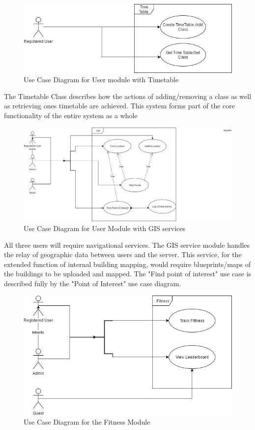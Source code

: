 \documentclass{article}
\begin{document}
		
	
		\begin{figure}[h]
			\includegraphics[width=\textwidth]{./Images/User_Use_Case_Diagrams_TimeTable.jpg}
			\caption{Use Case Diagram for User module with Timetable }
		\end{figure}
	
		{The Timetable Class describes how the actions of adding/removing a class as well as retrieving ones timetable are achieved. This system forms part of the core functionality of the entire system as a whole}
		
		\begin{figure}[h]
			\includegraphics[width=\textwidth]{./Images/User_Use_Case_Diagrams_GIS.jpg}
			\caption{Use Case Diagram for User Module with GIS services}
		\end{figure}
	
		{All three users will require navigational services. The GIS service module handles the relay of geographic data between users and the server. This service, for the extended function of internal building mapping, would require blueprints/maps of the buildings to be uploaded and mapped. The "Find point of interest" use case is described fully by the "Point of Interest" use case diagram. }
		
		\begin{figure}
			\includegraphics[width=\textwidth]{./Images/User_Use_Case_Fitness.jpg}
			\caption{Use Case Diagram for the Fitness Module}
		\end{figure}
	
\end{document}
